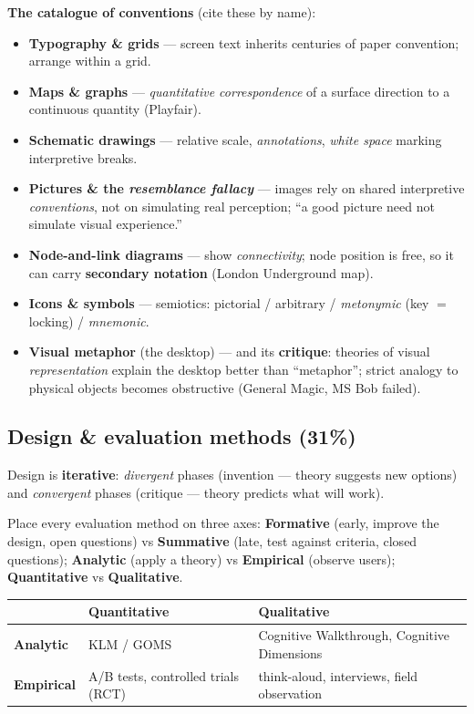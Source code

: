 \documentclass[11pt,a4paper]{article}
\begin{document}
\textbf{The catalogue of conventions} (cite these by name):
\begin{itemize}[leftmargin=*,itemsep=1pt]
  \item \textbf{Typography \& grids} --- screen text inherits centuries of paper convention; arrange within a grid.
  \item \textbf{Maps \& graphs} --- \emph{quantitative correspondence} of a surface direction to a continuous quantity (Playfair).
  \item \textbf{Schematic drawings} --- relative scale, \emph{annotations}, \emph{white space} marking interpretive breaks.
  \item \textbf{Pictures \& the \emph{resemblance fallacy}} --- images rely on shared interpretive \emph{conventions}, not on simulating real perception; ``a good picture need not simulate visual experience.''
  \item \textbf{Node-and-link diagrams} --- show \emph{connectivity}; node position is free, so it can carry \textbf{secondary notation} (London Underground map).
  \item \textbf{Icons \& symbols} --- semiotics: pictorial / arbitrary / \emph{metonymic} (key $=$ locking) / \emph{mnemonic}.
  \item \textbf{Visual metaphor} (the desktop) --- and its \textbf{critique}: theories of visual \emph{representation} explain the desktop better than ``metaphor''; strict analogy to physical objects becomes obstructive (General Magic, MS Bob failed).
\end{itemize}

\subsection{Design \& evaluation methods (31\%)}

Design is \textbf{iterative}: \emph{divergent} phases (invention --- theory suggests new options) and \emph{convergent} phases (critique --- theory predicts what will work).

\begin{must}
Place every evaluation method on three axes: \textbf{Formative} (early, improve the design, open questions) vs \textbf{Summative} (late, test against criteria, closed questions); \textbf{Analytic} (apply a theory) vs \textbf{Empirical} (observe users); \textbf{Quantitative} vs \textbf{Qualitative}.
\end{must}

\begin{center}
\begin{tabular}{lll}
\hline
 & \textbf{Quantitative} & \textbf{Qualitative} \\
\hline
\textbf{Analytic}  & KLM / GOMS & Cognitive Walkthrough, Cognitive Dimensions \\
\textbf{Empirical} & A/B tests, controlled trials (RCT) & think-aloud, interviews, field observation \\
\hline
\end{tabular}
\end{center}
\end{document}
